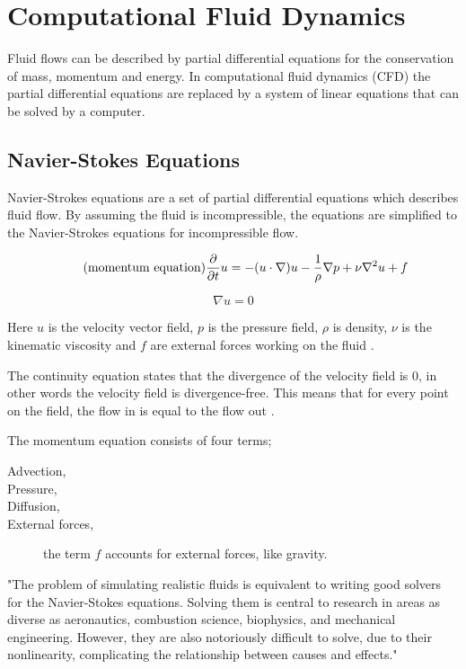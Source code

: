 \section{Computational Fluid Dynamics}

Fluid flows can be described by partial differential equations for the conservation 
of mass, momentum and energy. In computational fluid dynamics (CFD) the partial 
differential equations are replaced by a system of linear equations that can be 
solved by a computer. 

\subsection{Navier-Stokes Equations}

Navier-Strokes equations are a set of partial differential equations which describes 
fluid flow\cite{fluidDynamicsIntro}. By assuming the fluid is incompressible, 
the equations are simplified to the Navier-Strokes equations for incompressible 
flow\cite{originalSnowThesis}. 

\begin{equation} 
	\tag{momentum equation}
	\frac{\partial}{\partial t}u  = -(u \cdot \nabla)u - \frac{1}{\rho}\nabla p + \nu \nabla^2 u + f
\end{equation}

\begin{equation}
	\tag{continuity equation}
	\nabla u = 0
\end{equation}

Here $u$ is the velocity vector field, $p$ is the pressure field, $\rho$ is density,
$\nu$ is the kinematic viscosity and $f$ are external forces working on the fluid
\cite{gpuSnowThesis}. 

The continuity equation states that the divergence of the 
velocity field is 0, in other words the velocity field is divergence-free. This 
means that for every point on the field, the flow in is equal to the flow out
\cite{originalSnowThesis}. 

The momentum equation consists of four terms;
\begin{description}
	\item[Advection,] 
	\item[Pressure,]
	\item[Diffusion,]
	\item[External forces,] the term $f$ accounts for external forces, like gravity.
\end{description}

"The problem of simulating realistic fluids is equivalent
to writing good solvers for the Navier-Stokes
equations. Solving them is central to research in areas
as diverse as aeronautics, combustion science, biophysics,
and mechanical engineering. However, they
are also notoriously difficult to solve, due to their
nonlinearity, complicating the relationship between
causes and effects."

